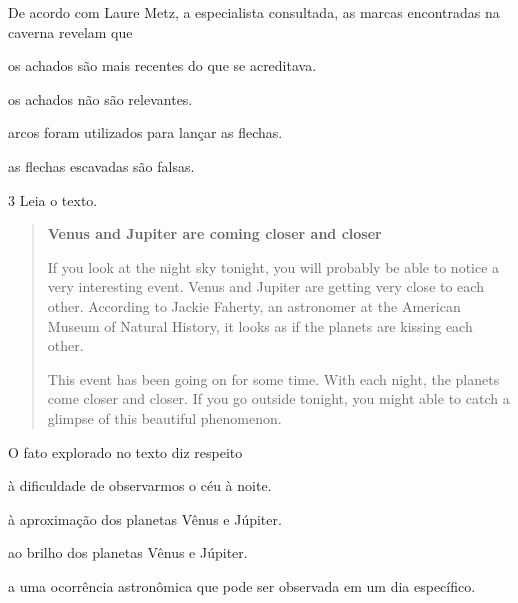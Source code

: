 De acordo com Laure Metz, a especialista consultada, as marcas encontradas na caverna revelam que

\begin{escolha}
\item os achados são mais recentes do que se acreditava.

\item os achados não são relevantes.

\item arcos foram utilizados para lançar as flechas.

\item as flechas escavadas são falsas.
\end{escolha}

\num{3} Leia o texto.

\begin{quote}
\textbf{Venus and Jupiter are coming closer and closer}

If you look at the night sky tonight, you will probably be able to notice a very interesting event. Venus and Jupiter are getting very close to each other. According to Jackie Faherty, an astronomer at the American Museum of Natural History, it looks as if the planets are kissing each other.

This event has been going on for some time. With each night, the planets come closer and closer. If you go outside tonight, you might able to catch a glimpse of this beautiful phenomenon. 

\end{quote}

O fato explorado no texto diz respeito

\begin{escolha}
\item à dificuldade de observarmos o céu à noite.

\item à aproximação dos planetas Vênus e Júpiter.

\item ao brilho dos planetas Vênus e Júpiter.

\item a uma ocorrência astronômica que pode ser observada em um dia específico.
\end{escolha}





